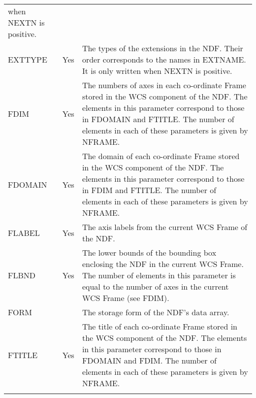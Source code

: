 \documentclass[twoside,11pt]{article}
\begin{document}
\begin{center}
\begin{tabular}{lcp{112mm}}
                when NEXTN is positive. \\
EXTTYPE & Yes & The types of the extensions in the NDF.  Their order
                corresponds to the names in EXTNAME.  It is only written when
                NEXTN is positive. \\
FDIM & Yes & The numbers of axes in each co-ordinate Frame stored in the WCS
             component of the NDF. The elements in this parameter correspond to
             those in FDOMAIN and FTITLE. The number of elements in
             each of these parameters is given by NFRAME. \\
FDOMAIN & Yes & The domain of each co-ordinate Frame stored in the WCS component
                of the NDF. The elements in this parameter correspond to those in
                FDIM and FTITLE. The number of elements in each of these
                parameters is given by NFRAME. \\
FLABEL & Yes & The axis labels from the current WCS Frame of the NDF. \\ 
FLBND  & Yes & The lower bounds of the bounding box enclosing the NDF in the
               current WCS Frame. The number of elements in this parameter is equal
               to the number of axes in the current WCS Frame (see FDIM).\\
FORM & & The storage form of the NDF's data array. \\
FTITLE & Yes & The title of each co-ordinate Frame stored in the WCS component
                of the NDF. The elements in this parameter correspond to those in
                FDOMAIN and FDIM.  The number of elements in each of these
                parameters is given by NFRAME. \\
\\ \hline
\end{tabular}
\end{center}
\end{document}
